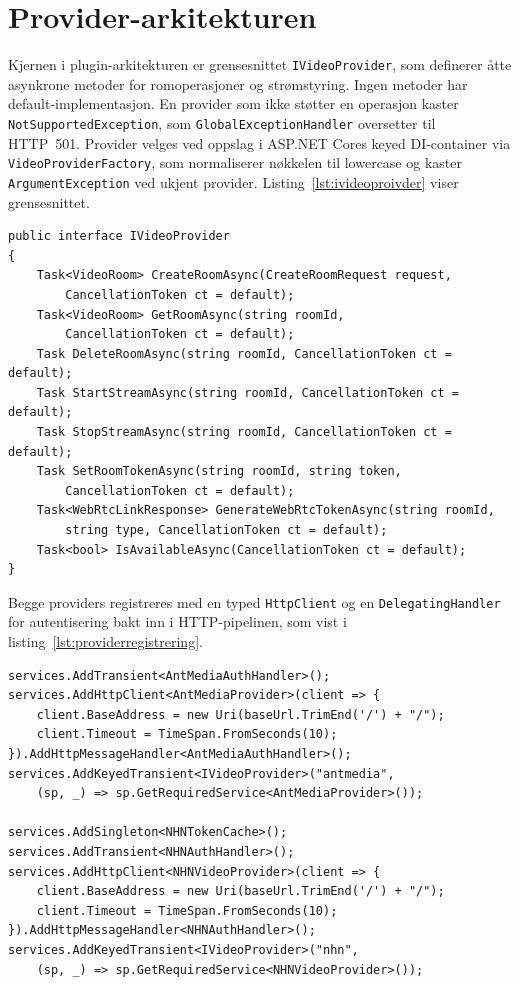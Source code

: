 \section{Provider-arkitekturen}
\label{sec:providers}

Kjernen i plugin-arkitekturen er grensesnittet \texttt{IVideoProvider},
som definerer åtte asynkrone metoder for romoperasjoner og
strømstyring. Ingen metoder har default-implementasjon. En provider som
ikke støtter en operasjon kaster \texttt{NotSupportedException}, som
\texttt{GlobalExceptionHandler} oversetter til HTTP~501. Provider velges
ved oppslag i ASP.NET Cores keyed DI-container via
\texttt{VideoProviderFactory}, som normaliserer nøkkelen til lowercase og
kaster \texttt{ArgumentException} ved ukjent provider.
Listing~\ref{lst:ivideoproivder} viser grensesnittet.

\begin{lstlisting}[language={[Sharp]C}, label=lst:ivideoproivder,
  caption={IVideoProvider-grensesnittet.}]
public interface IVideoProvider
{
    Task<VideoRoom> CreateRoomAsync(CreateRoomRequest request,
        CancellationToken ct = default);
    Task<VideoRoom> GetRoomAsync(string roomId,
        CancellationToken ct = default);
    Task DeleteRoomAsync(string roomId, CancellationToken ct = default);
    Task StartStreamAsync(string roomId, CancellationToken ct = default);
    Task StopStreamAsync(string roomId, CancellationToken ct = default);
    Task SetRoomTokenAsync(string roomId, string token,
        CancellationToken ct = default);
    Task<WebRtcLinkResponse> GenerateWebRtcTokenAsync(string roomId,
        string type, CancellationToken ct = default);
    Task<bool> IsAvailableAsync(CancellationToken ct = default);
}
\end{lstlisting}

Begge providers registreres med en typed \texttt{HttpClient} og en
\texttt{DelegatingHandler} for autentisering bakt inn i HTTP-pipelinen,
som vist i listing~\ref{lst:providerregistrering}.

\begin{lstlisting}[language={[Sharp]C}, label=lst:providerregistrering,
  caption={Registrering av providers som keyed services.}]
services.AddTransient<AntMediaAuthHandler>();
services.AddHttpClient<AntMediaProvider>(client => {
    client.BaseAddress = new Uri(baseUrl.TrimEnd('/') + "/");
    client.Timeout = TimeSpan.FromSeconds(10);
}).AddHttpMessageHandler<AntMediaAuthHandler>();
services.AddKeyedTransient<IVideoProvider>("antmedia",
    (sp, _) => sp.GetRequiredService<AntMediaProvider>());

services.AddSingleton<NHNTokenCache>();
services.AddTransient<NHNAuthHandler>();
services.AddHttpClient<NHNVideoProvider>(client => {
    client.BaseAddress = new Uri(baseUrl.TrimEnd('/') + "/");
    client.Timeout = TimeSpan.FromSeconds(10);
}).AddHttpMessageHandler<NHNAuthHandler>();
services.AddKeyedTransient<IVideoProvider>("nhn",
    (sp, _) => sp.GetRequiredService<NHNVideoProvider>());
\end{lstlisting}

